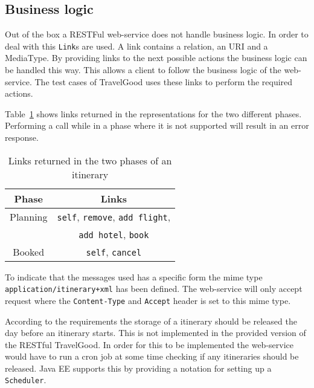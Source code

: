 \subsection{Business logic}
Out of the box a RESTFul web-service does not handle business logic. In order to deal with this \texttt{Link}s are used. A link contains a relation, an URI and a MediaType. By providing links to the next possible actions the business logic can be handled this way. This allows a client to follow the business logic of the web-service. The test cases of TravelGood uses these links to perform the required actions.

Table~\ref{table:rest_business_logic} shows links returned in the representations for the two different phases. Performing a call while in a phase where it is not supported will result in an error response.
\begin{table}
\begin{tabular}{|c|c|}
\hline
\textbf{Phase} & \textbf{Links} \\
\hline
Planning & \texttt{self}, \texttt{remove}, \texttt{add flight},\\
		 &\texttt{add hotel}, \texttt{book}\\
\hline
Booked & \texttt{self}, \texttt{cancel}\\
\hline
\end{tabular}
\caption{Links returned in the two phases of an itinerary}
\label{table:rest_business_logic}
\end{table}

To indicate that the messages used has a specific form the mime type \texttt{application/itinerary+xml} has been defined. The web-service will only accept request where the \texttt{Content-Type} and \texttt{Accept} header is set to this mime type.

According to the requirements the storage of a itinerary should be released the day before an itinerary starts. This is not implemented in the provided version of the RESTful TravelGood. In order for this to be implemented the web-service would have to run a cron job at some time checking if any itineraries should be released. Java EE supports this by providing a notation for setting up a \texttt{Scheduler}.

